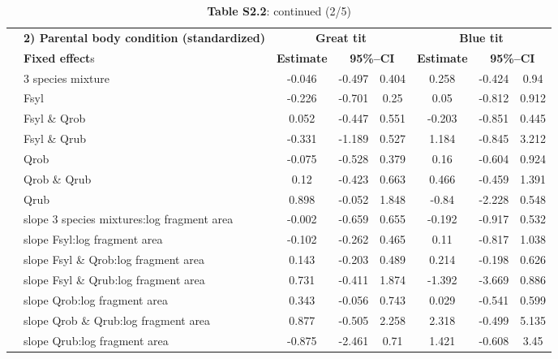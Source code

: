 \documentclass[10pt, twoside]{book} %
\begin{document}
\clearpage
\thispagestyle{plain}
\begin{landscape}
	\begin{table}
		\begin{center}
			\begin{footnotesize}
				\caption*{\textbf{Table S2.2}: continued (2/5)}
				
				\begingroup
				\setlength{\tabcolsep}{10pt} %
				\renewcommand{\arraystretch}{1.5} %
				\begin{tabular}{c l c c c c c c}
					\toprule
					& \textbf{2) Parental body condition (standardized)} & \multicolumn{3}{c}{\textbf{Great tit}} & \multicolumn{3}{c}{\textbf{Blue tit}}\\
					
					& \textbf{Fixed effect}s & \textbf{Estimate} & \multicolumn{2}{c}{\textbf{95\%--CI}} & \textbf{Estimate} & \multicolumn{2}{c}{\textbf{95\%--CI}}\\
					\cline{2-8}
					
					\multirow{7}{*}{\rotatebox[origin=c]{90}{\parbox[c]{3cm}{\centering Intercept (value for  average fragment area)}}}
					
					& 3 species mixture & -0.046 & -0.497 & 0.404 & 0.258 & -0.424 & 0.94\\
					& Fsyl & -0.226 & -0.701 & 0.25 & 0.05 & -0.812 & 0.912\\
					& Fsyl \& Qrob & 0.052 & -0.447 & 0.551 & -0.203 & -0.851 & 0.445\\
					& Fsyl \& Qrub & -0.331 & -1.189 & 0.527 & 1.184 & -0.845 & 3.212\\
					& Qrob & -0.075 & -0.528 & 0.379 & 0.16 & -0.604 & 0.924\\
					& Qrob \& Qrub & 0.12 & -0.423 & 0.663 & 0.466 & -0.459 & 1.391\\
					& Qrub & 0.898 & -0.052 & 1.848 & -0.84 & -2.228 & 0.548\\
					\cline{2-8}
					\multirow{7}{*}{\rotatebox[origin=c]{90}{\parbox[c]{3cm}{\centering Slopes)}}} & slope 3 species mixtures:log fragment area & -0.002 & -0.659 & 0.655 & -0.192 & -0.917 & 0.532\\
					& slope Fsyl:log fragment area & -0.102 & -0.262 & 0.465 & 0.11 & -0.817 & 1.038\\
					& slope Fsyl \& Qrob:log fragment area &0.143 & -0.203 & 0.489 & 0.214 & -0.198 & 0.626\\
					& slope Fsyl \& Qrub:log fragment area & 0.731 & -0.411 & 1.874 & -1.392 & -3.669 & 0.886\\
					& slope Qrob:log fragment area & 0.343 & -0.056 & 0.743 & 0.029 & -0.541 & 0.599\\
					& slope Qrob \& Qrub:log fragment area & 0.877 & -0.505 & 2.258 & 2.318 & -0.499 & 5.135\\
					& slope Qrub:log fragment area & -0.875 & -2.461 & 0.71 & 1.421 & -0.608 & 3.45\\
					\cline{2-8}
					

\end{tabular}
\end{footnotesize}
\end{center}
\end{table}
\end{landscape}
\end{document}
